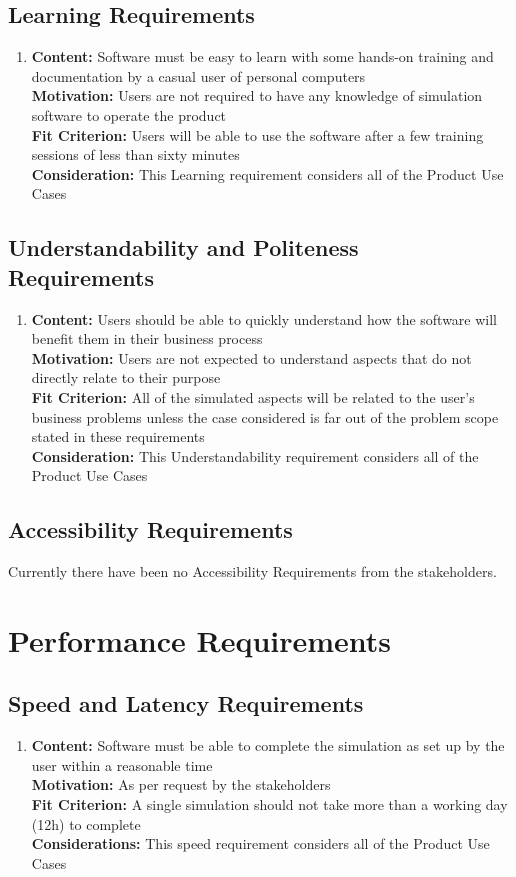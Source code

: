 \documentclass[paper=letter, fontsize=10pt]{scrartcl}
\numberwithin{equation}{section}		%
\numberwithin{figure}{section}			%
\numberwithin{table}{section}				%
\begin{document}
\subsection{Learning Requirements}
\begin{enumerate}
	\item \textbf{Content:} Software must be easy to learn with some hands-on training and documentation by a casual user of personal computers
	\\	  \textbf{Motivation:} Users are not required to have any knowledge of simulation software to operate the product
	\\	  \textbf{Fit Criterion:} Users will be able to use the software after a few training sessions of less than sixty minutes	\\	  \textbf{Consideration:} This Learning requirement considers all of the Product Use Cases
\end{enumerate}
\subsection{Understandability and Politeness Requirements}
\begin{enumerate}
	\item \textbf{Content:} Users should be able to quickly understand how the software will benefit them in their business process
	\\	  \textbf{Motivation:} Users are not expected to understand aspects that do not directly relate to their purpose
	\\	  \textbf{Fit Criterion:} All of the simulated aspects will be related to the user's business problems unless the case considered is far out of the problem scope stated in these requirements
	\\	  \textbf{Consideration:} This Understandability requirement considers all of the Product Use Cases	
\end{enumerate}
\subsection{Accessibility Requirements}
Currently there have been no Accessibility Requirements from the stakeholders.

\section{Performance Requirements}
\subsection{Speed and Latency Requirements}
\begin{enumerate}
	\item \textbf{Content:} Software must be able to complete the simulation as set up by the user within a reasonable time
	\\	  \textbf{Motivation:} As per request by the stakeholders
	\\	  \textbf{Fit Criterion:} A single simulation should not take more than a working day (12h) to complete
	\\	  \textbf{Considerations:} This speed requirement considers all of the Product Use Cases
\end{enumerate}
\end{document}
